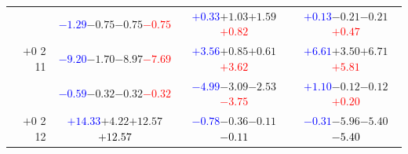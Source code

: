 \documentclass[compress]{beamer}
\begin{document}
\begin{frame}
\begin{tabular}{r | c | c | c}
          & \textcolor{blue}{$-1.29$}\hspace{0.1 cm}$-0.75$\hspace{0.1 cm}$-0.75$\hspace{0.1 cm}\textcolor{red}{$-0.75$} & \textcolor{blue}{$+0.33$}\hspace{0.1 cm}$+1.03$\hspace{0.1 cm}$+1.59$\hspace{0.1 cm}\textcolor{red}{$+0.82$} & \textcolor{blue}{$+0.13$}\hspace{0.1 cm}$-0.21$\hspace{0.1 cm}$-0.21$\hspace{0.1 cm}\textcolor{red}{$+0.47$} \\
$+$0 2 11 & \textcolor{blue}{$-9.20$}\hspace{0.1 cm}$-1.70$\hspace{0.1 cm}$-8.97$\hspace{0.1 cm}\textcolor{red}{$-7.69$} & \textcolor{blue}{$+3.56$}\hspace{0.1 cm}$+0.85$\hspace{0.1 cm}$+0.61$\hspace{0.1 cm}\textcolor{red}{$+3.62$} & \textcolor{blue}{$+6.61$}\hspace{0.1 cm}$+3.50$\hspace{0.1 cm}$+6.71$\hspace{0.1 cm}\textcolor{red}{$+5.81$} \\
          & \textcolor{blue}{$-0.59$}\hspace{0.1 cm}$-0.32$\hspace{0.1 cm}$-0.32$\hspace{0.1 cm}\textcolor{red}{$-0.32$} & \textcolor{blue}{$-4.99$}\hspace{0.1 cm}$-3.09$\hspace{0.1 cm}$-2.53$\hspace{0.1 cm}\textcolor{red}{$-3.75$} & \textcolor{blue}{$+1.10$}\hspace{0.1 cm}$-0.12$\hspace{0.1 cm}$-0.12$\hspace{0.1 cm}\textcolor{red}{$+0.20$} \\
$+$0 2 12 & \textcolor{blue}{$+14.33$}\hspace{0.1 cm}$+4.22$\hspace{0.1 cm}$+12.57$\hspace{0.1 cm}\textcolor{black}{$+12.57$} & \textcolor{blue}{$-0.78$}\hspace{0.1 cm}$-0.36$\hspace{0.1 cm}$-0.11$\hspace{0.1 cm}\textcolor{black}{$-0.11$} & \textcolor{blue}{$-0.31$}\hspace{0.1 cm}$-5.96$\hspace{0.1 cm}$-5.40$\hspace{0.1 cm}\textcolor{black}{$-5.40$} \\

\end{tabular}
\end{frame}
\end{document}

